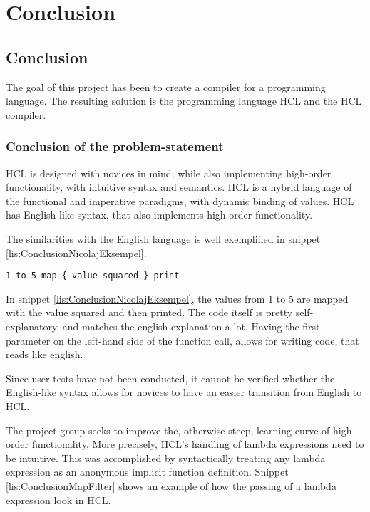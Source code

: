 \chapter{Conclusion}
\section{Conclusion}
The goal of this project has been to create a compiler for a programming language.
The resulting solution is the programming language HCL and the HCL compiler.

\subsection{Conclusion of the problem-statement}
HCL is designed with novices in mind, while also implementing high-order functionality, with intuitive syntax and semantics.
HCL is a hybrid language of the functional and imperative paradigms, with dynamic binding of values.
HCL has English-like syntax, that also implements high-order functionality.

The similarities with the English language is well exemplified in snippet \ref{lis:ConclusionNicolajEksempel}.
\begin{lstlisting}[language=hcl,label=lis:ConclusionNicolajEksempel,caption=English-like syntax example]
1 to 5 map { value squared } print
\end{lstlisting}
In snippet \ref{lis:ConclusionNicolajEksempel}, the values from 1 to 5 are mapped with the value squared and then printed.
The code itself is pretty self-explanatory, and matches the english explanation a lot.
Having the first parameter on the left-hand side of the function call, allows for writing code, that reads like english.

Since user-tests have not been conducted, it cannot be verified whether the English-like syntax allows for novices to have an easier transition from English to HCL.

The project group seeks to improve the, otherwise steep, learning curve of high-order functionality.
More precisely, HCL's handling of lambda expressions need to be intuitive.
This was accomplished by syntactically treating any lambda expression as an anonymous implicit function definition.
Snippet \ref{lis:ConclusionMapFilter} shows an example of how the passing of a lambda expression look in HCL.

